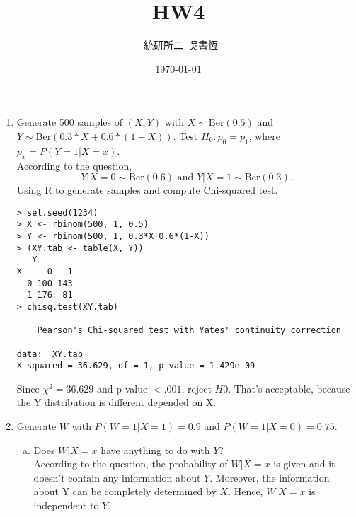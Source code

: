 
\pagestyle{fancy}
\fancyfoot[C]{\thepage}
\title{{\CF HW4}}
\author{{\  統研所二\  吳書恆}}
\date{{\CF \today}}


\maketitle \thispagestyle{fancy}
\fontsize{11}{20 pt}\selectfont

\begin{enumerate}
\item Generate 500 samples of $(X, Y)$ with $X\sim \text{Ber}(0.5)$ and $Y\sim \text{Ber}(0.3*X+0.6*(1-X))$. Test $H_0: p_0=p_1$, where $p_x=P(Y=1|X=x)$.\\
According to the question, \[Y|X=0\sim\text{Ber}(0.6)\text{ and }Y|X=1\sim\text{Ber}(0.3).\] Using R to generate samples and compute Chi-squared test.
\begin{lstlisting}
> set.seed(1234)
> X <- rbinom(500, 1, 0.5)
> Y <- rbinom(500, 1, 0.3*X+0.6*(1-X))
> (XY.tab <- table(X, Y))
   Y
X     0   1
  0 100 143
  1 176  81
> chisq.test(XY.tab)

	Pearson's Chi-squared test with Yates' continuity correction

data:  XY.tab
X-squared = 36.629, df = 1, p-value = 1.429e-09
\end{lstlisting}
Since $\chi^2 = 36.629$ and p-value $<.001$, reject $H0$. That's acceptable, because the Y distribution is different depended on X.

\item Generate $W$ with $P(W=1|X=1)=0.9$ and $P(W=1|X=0)=0.75$.
\begin{enumerate}[(a)]
\item Does $W|X=x$ have anything to do with $Y$?\\
According to the question, the probability of $W|X=x$ is given and it doesn't contain any information about $Y$. Moreover, the information about Y can be completely determined by $X$. Hence, $W|X=x$ is independent to $Y$.


\end{enumerate}
\end{enumerate}
